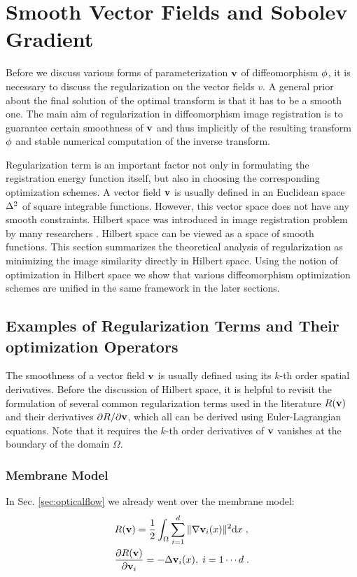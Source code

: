 \documentclass[letterpaper,12pt]{article}
\begin{document}
\section{Smooth Vector Fields and Sobolev Gradient}

Before we discuss various forms of parameterization $\mathbf{v}$ of diffeomorphism $\phi$, it is necessary to discuss the regularization on the vector fields $v$. A general prior about the final solution of the optimal transform is that it has to be a smooth one. The main aim of regularization in diffeomorphism image registration is to guarantee certain smoothness of $\mathbf{v}$ and thus implicitly of the resulting transform $\phi$ and stable numerical computation of the inverse transform. 

Regularization term is an important factor not only in formulating the registration energy function itself, but  also in choosing the corresponding optimization schemes. A vector field $\mathbf{v}$ is usually defined in an Euclidean space $\Delta^2$ of square integrable functions. However, this vector space does not have any smooth constraints. Hilbert space was introduced in image registration problem by many researchers \cite{Trouve1998, Beg2005Computing, Hernandez2008, Zikic2010}. Hilbert space can be viewed as a space of smooth functions. This section summarizes the theoretical analysis of regularization as minimizing the image similarity directly in Hilbert space. Using the notion of optimization in Hilbert space we show that various diffeomorphism optimization schemes are unified in the same framework in the later sections.


\subsection{Examples of Regularization Terms and Their optimization Operators}
\label{sec:regularizerexample}

The smoothness of a vector field $\mathbf{v}$ is usually defined using its $k$-th order spatial derivatives. Before the discussion of Hilbert space, it is helpful to revisit the formulation of several common regularization terms used in the literature \cite{Horn1981,Beg2005Computing,Ashburner2007,Vercauteren2009} $R(\mathbf{v})$ and their derivatives $\partial R/\partial\mathbf{v}$, which all can be derived using Euler-Lagrangian equations. Note that it requires the $k$-th order derivatives of $\mathbf{v}$ vanishes at the boundary of the domain $\Omega$.

\subsubsection*{Membrane Model}
In Sec. \ref{sec:opticalflow} we already went over the membrane model:
\begin{align}
\label{eq:membraneA}
& R(\mathbf{v}) = \frac{1}{2} \int_\Omega \sum_{i=1}^d \| \nabla \mathbf{v}_i(x) \|^2 \text{d} x \;, \\
\label{eq:membraneAEL}
& \frac{\partial R(\mathbf{v})}{\partial \mathbf{v}_i} = -  \Delta \mathbf{v}_i(x)
, \; i=1 \cdots d \;. 
\end{align}
\end{document}
